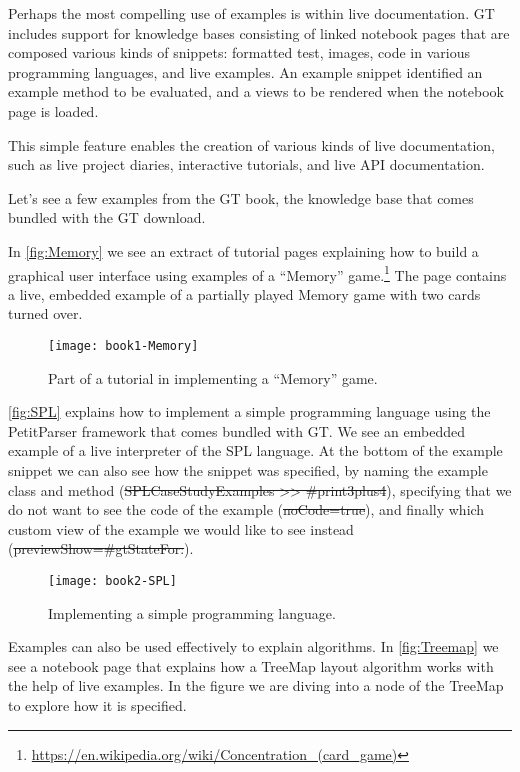 \documentclass[sigplan,anonymous,review,10pt]{acmart}
\begin{document}
Perhaps the most compelling use of examples is within live documentation.
GT includes support for knowledge bases consisting of linked notebook pages that are composed various kinds of snippets: formatted test, images, code in various programming languages, and live examples.
An example snippet identified an example method to be evaluated, and a views to be rendered when the notebook page is loaded.

This simple feature enables the creation of various kinds of live documentation, such as live project diaries, interactive tutorials, and live API documentation.

Let's see a few examples from the GT book, the knowledge base that comes bundled with the GT download.

In \autoref{fig:Memory} we see an extract of tutorial pages explaining how to build a graphical user interface using examples of a ``Memory'' game.\footnote{\url{https://en.wikipedia.org/wiki/Concentration_(card_game)}}
The page contains a live, embedded example of a partially played Memory game with two cards turned over.

\begin{figure}[h]
  \texttt{[image: book1-Memory]}
  \caption{Part of a tutorial in implementing a ``Memory'' game.}
  \label{fig:Memory}
\end{figure}

\autoref{fig:SPL} explains how to implement a simple programming language using the PetitParser framework that comes bundled with GT.
We see an embedded example of a live interpreter of the SPL language.
At the bottom of the example snippet we can also see how the snippet was specified, by naming the example class and method (\st{SPLCaseStudyExamples >> #print3plus4}), specifying that we do not want to see the code of the example (\st{noCode=true}), and finally which custom view of the example we would like to see instead (\st{previewShow=#gtStateFor:}).

\begin{figure}[h]
  \texttt{[image: book2-SPL]}
  \caption{Implementing a simple programming language.}
  \label{fig:SPL}
\end{figure}

Examples can also be used effectively to explain algorithms.
In \autoref{fig:Treemap} we see a notebook page that explains how a TreeMap layout algorithm works with the help of live examples.
In the figure we are diving into a node of the TreeMap to explore how it is specified.
\end{document}
